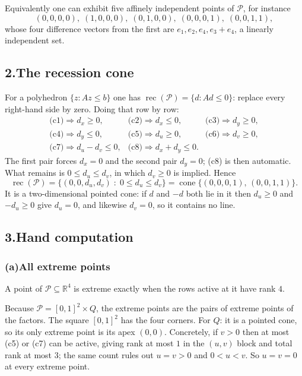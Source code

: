 \documentclass[11pt]{article}
\DeclareMathOperator{\cone}{cone}
\DeclareMathOperator{\rec}{rec}
\theoremstyle{definition}
\theoremstyle{plain}
\begin{document}
Equivalently one can exhibit five affinely independent points of
$\mathcal{P}$, for instance
\[
  (0,0,0,0),\;(1,0,0,0),\;(0,1,0,0),\;(0,0,0,1),\;(0,0,1,1),
\]
whose four difference vectors from the first are
$e_1, e_2, e_4, e_3 + e_4$, a linearly independent set.

\subsection*{2.\quad The recession cone}

For a polyhedron $\{z : Az \le b\}$ one has
$\rec(\mathcal{P}) = \{d : Ad \le 0\}$: replace every right-hand side by
zero. Doing that row by row:
\[
  \begin{array}{lll}
  \text{(c1)} \Rightarrow d_x \ge 0, &
  \text{(c2)} \Rightarrow d_x \le 0, &
  \text{(c3)} \Rightarrow d_y \ge 0, \\
  \text{(c4)} \Rightarrow d_y \le 0, &
  \text{(c5)} \Rightarrow d_u \ge 0, &
  \text{(c6)} \Rightarrow d_v \ge 0, \\
  \text{(c7)} \Rightarrow d_u - d_v \le 0, &
  \text{(c8)} \Rightarrow d_x + d_y \le 0 . &
  \end{array}
\]
The first pair forces $d_x = 0$ and the second pair $d_y = 0$; (c8) is
then automatic. What remains is $0 \le d_u \le d_v$, in which
$d_v \ge 0$ is implied. Hence
\[
  \boxed{\;
  \rec(\mathcal{P})
  = \big\{ (0,0,d_u,d_v) \;:\; 0 \le d_u \le d_v \big\}
  = \cone\{(0,0,0,1),\,(0,0,1,1)\}. \;}
\]
It is a two-dimensional pointed cone: if $d$ and $-d$ both lie in it
then $d_u \ge 0$ and $-d_u \ge 0$ give $d_u = 0$, and likewise
$d_v = 0$, so it contains no line.

\subsection*{3.\quad Hand computation}

\subsubsection*{(a)\quad All extreme points}

A point of $\mathcal{P} \subseteq \mathbb{R}^4$ is extreme exactly when
the rows active at it have rank $4$.

Because $\mathcal{P} = [0,1]^2 \times Q$, the extreme points are the
pairs of extreme points of the factors. The square $[0,1]^2$ has the
four corners. For $Q$: it is a pointed cone, so its only extreme point
is its apex $(0,0)$. Concretely, if $v > 0$ then at most (c5) or (c7)
can be active, giving rank at most $1$ in the $(u,v)$ block and total
rank at most $3$; the same count rules out $u = v > 0$ and
$0 < u < v$. So $u = v = 0$ at every extreme point.
\end{document}
